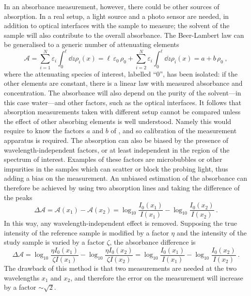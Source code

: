 In an absorbance measurement, however, there could be other sources of absorption.
In a real setup, a light source and a photo sensor are needed, in addition to optical interfaces with the %
sample to measure; the solvent of the sample will also contribute to the overall absorbance.
The Beer-Lambert law can be generalised to a generic number of attenuating elements
\begin{equation}
	\label{eq:linear_bl}
	\mathcal{A} = \sum_{i = 1}^N \varepsilon_i \int_0^\ell \dd{z} \rho_i (x) = %
	\ell\,\varepsilon_0\,\rho_0 +  \sum_{i = 2}^N \varepsilon_i \int_0^\ell \dd{z} \rho_i (x) = a + b \, \rho_0\ ,
\end{equation}
where the attenuating species of interest, labelled ``0'', has been isolated: %
if the other elements are constant, there is a linear law with measured absorbance and concentration.
The absorbance will also depend on the purity of the solvent---in this case water---and other factors, %
such as the optical interfaces.
It follows that absorption measurements taken with different setup cannot be compared unless the %
effect of other absorbing elements is well understood.
Namely this would require to know the factors $a$ and $b$ of , %
and so calibration of the measurement apparatus is required.
The absorption can also be biased by the presence of wavelength-independent factors, %
or at least independent in the region of the spectrum of interest.
Examples of these factors are microbubbles or other impurities in the samples which %
can scatter or block the probing light, thus adding a bias on the measurement.
An unbiased estimation of the absorbance can therefore be achieved by using two absorption lines %
and taking the difference of the peaks %
\begin{equation}
	\Delta \mathcal{A} = \mathcal{A}(x_1) - \mathcal{A}(x_2) = %
	\log_{10} \frac{I_0 (x_1)}{I(x_1)} - \log_{10} \frac{I_0 (x_2)}{I(x_2)}\ .
\end{equation}
In this way, any wavelength-independent effect is removed.
Supposing the true intensity of the reference sample is modified by a factor $\eta$ %
and the intensity of the study sample is varied by a factor $\zeta$, the absorbance difference is
\begin{equation}
	\Delta \mathcal{A} = %
	\log_{10} \frac{\eta I_0 (x_1)}{\zeta I(x_1)} - \log_{10} \frac{\eta I_0 (x_2)}{\zeta I(x_2)} = %
	\log_{10} \frac{I_0 (x_1)}{I(x_1)} - \log_{10} \frac{I_0 (x_2)}{I(x_2)}\ .
\end{equation}
The drawback of this method is that two measurements are needed at the two wavelengths $x_1$ and $x_2$, %
and therefore the error on the measurement will increase by a factor $\sim\sqrt{2}$.


